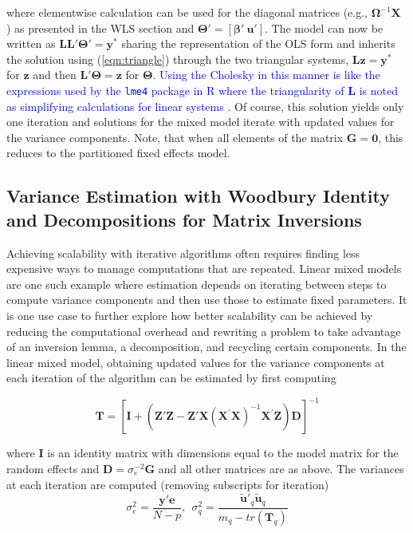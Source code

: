 \documentclass[12pt]{article}
\begin{document}
\noindent where elementwise calculation can be used for the diagonal matrices (e.g., $\bm{\Omega}^{-1}\bm{X}$ ) as presented in the WLS section and $\bm{\Theta}' = \left[\bm{\beta}' \ \bm{u}'\right]$. The model can now be written as $\bm{L}\bm{L}'\bm{\Theta}'=\bm{y}^*$ sharing the representation of the OLS form and inherits the solution using (\ref{eqn:triangle}) through the two triangular systems, $\bm{L}\bm{z}  = \bm{y}^*$ for $\bm{z}$ and then $\bm{L}' \bm{\Theta}  = \bm{z}$ for $\bm{\Theta}$. \textcolor{blue}{Using the Cholesky in this manner is like the expressions used by the \texttt{lme4} package in R where the triangularity of $\bm{L}$ is noted as simplifying calculations for linear systems \cite{doranjss}.} Of course, this solution yields only one iteration and solutions for the mixed model iterate with updated values for the variance components. Note, that when all elements of the matrix $\bm{G} = \bm{0}$, this reduces to the partitioned fixed effects model.

\subsection*{Variance Estimation with Woodbury Identity and Decompositions for Matrix Inversions}

Achieving scalability with iterative algorithms often requires finding less expensive ways to manage computations that are repeated. Linear mixed models are one such example where estimation depends on iterating between steps to compute variance components and then use those to estimate fixed parameters. It is one use case to further explore how better scalability can be achieved by reducing the computational overhead and rewriting a problem to take advantage of an inversion lemma, a decomposition, and recycling certain components. In the linear mixed model, obtaining updated values for the variance components at each iteration of the algorithm can be estimated by first computing \cite{mcandsearle:2001}

\begin{equation}
	\label{eqn:varUpdate}
	\bm{T} = \left[\bm{I} + \left(\bm{Z}'\bm{Z} - \bm{Z}'\bm{X} (\bm{X}^{'}\bm{X})^{-1} \bm{X}^{'}\bm{Z}\right)\bm{D}\right]^{-1}
\end{equation}

\noindent where $\bm{I}$ is an identity matrix with dimensions equal to the model matrix for the random effects and $\bm{D} = \sigma_{e}^{-2}\bm{G}$ and all other matrices are as above. The variances at each iteration are computed (removing subscripts for iteration)
\begin{equation}
	\label{eqn:vars:mixed}
	\sigma_{e}^2 = \frac{\bm{y}'\bm{e}}{N-p}, \ \ \sigma^2_{q} = \frac{\widetilde{\bm{u}}'_{q}\widetilde{\bm{u}}_{q}} {m_q - tr(\bm{T}_q)} 
\end{equation}
\end{document}

